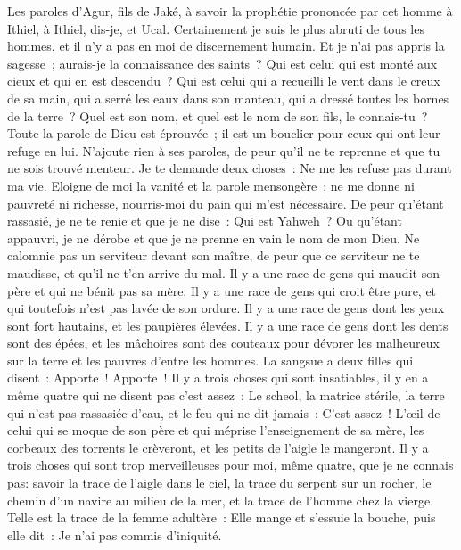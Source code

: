 \begin{multicols}{2}
\VerseOne{}Les paroles d'Agur, fils de Jaké, à savoir la prophétie prononcée par cet homme à Ithiel, à Ithiel, dis-je, et Ucal.
Certainement je suis le plus abruti de tous les hommes, et il n'y a pas en moi de discernement humain.
Et je n'ai pas appris la sagesse~; aurais-je la connaissance des saints~?
Qui est celui qui est monté aux cieux et qui en est descendu~? Qui est celui qui a recueilli le vent dans le creux de sa main, qui a serré les eaux dans son manteau, qui a dressé toutes les bornes de la terre~? Quel est son nom, et quel est le nom de son fils, le connais-tu~?
Toute la parole de Dieu est éprouvée~; il est un bouclier pour ceux qui ont leur refuge en lui.
N'ajoute rien à ses paroles, de peur qu'il ne te reprenne et que tu ne sois trouvé menteur.
Je te demande deux choses~: Ne me les refuse pas durant ma vie.
Eloigne de moi la vanité et la parole mensongère~; ne me donne ni pauvreté ni richesse, nourris-moi du pain qui m'est nécessaire.
De peur qu'étant rassasié, je ne te renie et que je ne dise~: Qui est Yahweh~? Ou qu'étant appauvri, je ne dérobe et que je ne prenne en vain le nom de mon Dieu.
Ne calomnie pas un serviteur devant son maître, de peur que ce serviteur ne te maudisse, et qu'il ne t'en arrive du mal.
Il y a une race de gens qui maudit son père et qui ne bénit pas sa mère.
Il y a une race de gens qui croit être pure, et qui toutefois n'est pas lavée de son ordure.
Il y a une race de gens dont les yeux sont fort hautains, et les paupières élevées.
Il y a une race de gens dont les dents sont des épées, et les mâchoires sont des couteaux pour dévorer les malheureux sur la terre et les pauvres d'entre les hommes.
La sangsue a deux filles qui disent~: Apporte~! Apporte~! Il y a trois choses qui sont insatiables, il y en a même quatre qui ne disent pas c'est assez~:
Le scheol, la matrice stérile, la terre qui n'est pas rassasiée d'eau, et le feu qui ne dit jamais~: C'est assez~!
L'œil de celui qui se moque de son père et qui méprise l'enseignement de sa mère, les corbeaux des torrents le crèveront, et les petits de l'aigle le mangeront.
Il y a trois choses qui sont trop merveilleuses pour moi, même quatre, que je ne connais pas:
savoir la trace de l'aigle dans le ciel, la trace du serpent sur un rocher, le chemin d'un navire au milieu de la mer, et la trace de l'homme chez la vierge.
Telle est la trace de la femme adultère~: Elle mange et s'essuie la bouche, puis elle dit~: Je n'ai pas commis d'iniquité.

\end{multicols}
